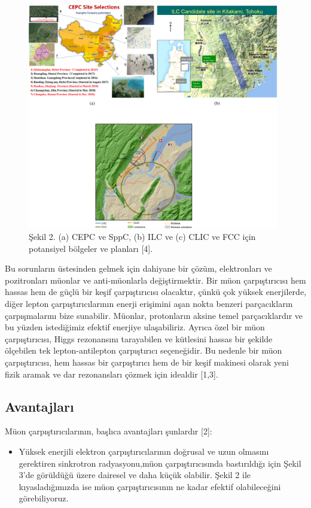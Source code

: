 \documentclass{article}
\begin{document}
 \begin{figure}[h]
 \centering
\includegraphics[width=11cm]{image/1111.png}
\caption*{Şekil 2. (a) CEPC ve SppC, (b) ILC ve (c) CLIC ve FCC için potansiyel bölgeler ve planları [4].}
	\end{figure}

 
 
Bu sorunların üstesinden gelmek için dahiyane bir çözüm, elektronları ve pozitronları müonlar ve anti-müonlarla değiştirmektir. Bir müon çarpıştırıcısı hem hassas hem de güçlü bir keşif çarpıştırıcısı olacaktır, çünkü çok yüksek enerjilerde, diğer lepton çarpıştırıcılarının enerji erişimini aşan nokta benzeri parçacıkların çarpışmalarını bize sunabilir. Müonlar, protonların aksine temel parçacıklardır ve bu yüzden istediğimiz efektif enerjiye ulaşabiliriz. Ayrıca özel bir müon çarpıştırıcısı, Higgs rezonansını tarayabilen ve kütlesini hassas bir şekilde ölçebilen tek lepton-antilepton çarpıştırıcı seçeneğidir. Bu nedenle bir müon çarpıştırıcısı, hem hassas bir çarpıştırıcı hem de bir keşif makinesi olarak yeni fizik aramak ve dar rezonansları çözmek için idealdir [1,3].

\subsection{Avantajları}

Müon çarpıştırıcılarının, başlıca avantajları şunlardır [2]: 

\begin{itemize}
    \item Yüksek enerjili elektron çarpıştırıcılarının doğrusal ve uzun olmasını gerektiren sinkrotron radyasyonu,müon çarpıştırıcısında bastırıldığı için Şekil 3'de görüldüğü üzere dairesel ve daha küçük olabilir. Şekil 2 ile kıyasladığımızda ise müon çarpıştırıcısının ne kadar efektif olabileceğini görebiliyoruz.
\end{itemize}
\end{document}
